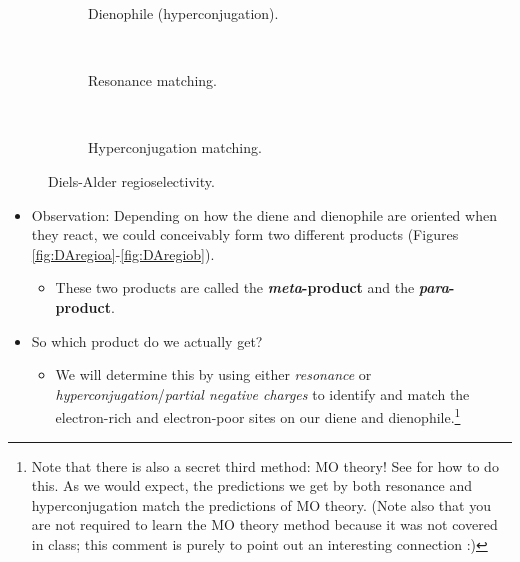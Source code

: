 \documentclass[../notes.tex]{subfiles}
\begin{document}
\begin{itemize}
\begin{figure}[H]
\begin{subfigure}[b]{0.45\linewidth}
{            }
            \vspace{5mm}
            \caption{Dienophile (hyperconjugation).}
            \label{fig:DAregiof}
        \end{subfigure}\\[2em]
        \begin{subfigure}[b]{0.4\linewidth}
            \centering
            \caption{Resonance matching.}
            \label{fig:DAregiog}
        \end{subfigure}\\[2em]
        \begin{subfigure}[b]{0.4\linewidth}
            \centering
            \caption{Hyperconjugation matching.}
            \label{fig:DAregioh}
        \end{subfigure}
        \caption{Diels-Alder regioselectivity.}
        \label{fig:DAregio}
    \end{figure}
    \begin{itemize}
        \item Observation: Depending on how the diene and dienophile are oriented when they react, we could conceivably form two different products (Figures \ref{fig:DAregioa}-\ref{fig:DAregiob}).
        \begin{itemize}
            \item These two products are called the \textbf{\emph{meta}-product} and the \textbf{\emph{para}-product}.
        \end{itemize}
        \pagebreak
        \item So which product do we actually get?
        \begin{itemize}
            \item We will determine this by using either \emph{resonance} or \emph{hyperconjugation}/\emph{partial negative charges} to identify and match the electron-rich and electron-poor sites on our diene and dienophile.\footnote{Note that there is also a secret third method: MO theory! See \textcite[890]{bib:Clayden} for how to do this. As we would expect, the predictions we get by both resonance and hyperconjugation match the predictions of MO theory. (Note also that you are not required to learn the MO theory method because it was not covered in class; this comment is purely to point out an interesting connection :)}

\end{itemize}
\end{itemize}
\end{itemize}
\end{document}
